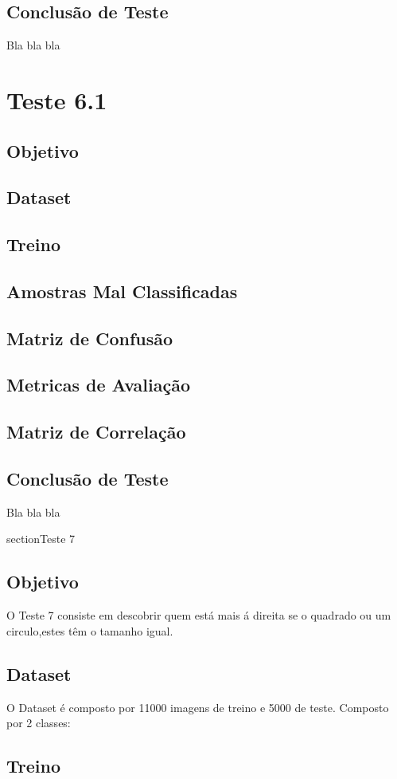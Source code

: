 \subsection{Conclusão de Teste}
    Bla bla bla


\section{Teste 6.1}
\subsection{Objetivo}
\subsection{Dataset}
\subsection{Treino}
\subsection{Amostras Mal Classificadas}
\subsection{Matriz de Confusão}
\subsection{Metricas de Avaliação}
\subsection{Matriz de Correlação}
\subsection{Conclusão de Teste}
    Bla bla bla

section{Teste 7}
\subsection{Objetivo}
    O Teste 7 consiste em descobrir quem está mais á direita se o quadrado ou um circulo,estes têm o tamanho igual.
\subsection{Dataset}
O Dataset é composto por 11000 imagens de treino e 5000 de teste. Composto por 2 classes:
\subsection{Treino}
